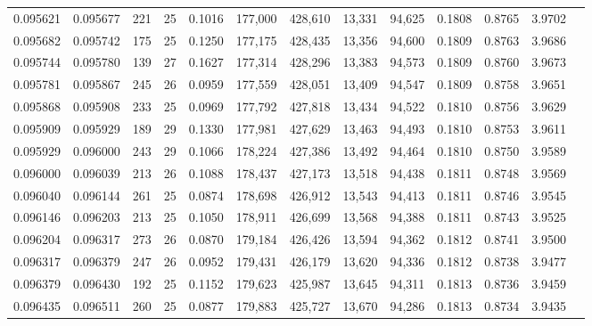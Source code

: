 \begin{tabular}{rrrrrrrrrrrrr}
0.095621 & 0.095677 & 221 &  25 &                                     0.1016 & 177,000 & 428,610 &  13,331 &  94,625 & 0.1808 & 0.8765 & 3.9702 \\
0.095682 & 0.095742 & 175 &  25 &                                     0.1250 & 177,175 & 428,435 &  13,356 &  94,600 & 0.1809 & 0.8763 & 3.9686 \\
0.095744 & 0.095780 & 139 &  27 &                                     0.1627 & 177,314 & 428,296 &  13,383 &  94,573 & 0.1809 & 0.8760 & 3.9673 \\
0.095781 & 0.095867 & 245 &  26 &                                     0.0959 & 177,559 & 428,051 &  13,409 &  94,547 & 0.1809 & 0.8758 & 3.9651 \\
0.095868 & 0.095908 & 233 &  25 &                                     0.0969 & 177,792 & 427,818 &  13,434 &  94,522 & 0.1810 & 0.8756 & 3.9629 \\
0.095909 & 0.095929 & 189 &  29 &                                     0.1330 & 177,981 & 427,629 &  13,463 &  94,493 & 0.1810 & 0.8753 & 3.9611 \\
0.095929 & 0.096000 & 243 &  29 &                                     0.1066 & 178,224 & 427,386 &  13,492 &  94,464 & 0.1810 & 0.8750 & 3.9589 \\
0.096000 & 0.096039 & 213 &  26 &                                     0.1088 & 178,437 & 427,173 &  13,518 &  94,438 & 0.1811 & 0.8748 & 3.9569 \\
0.096040 & 0.096144 & 261 &  25 &                                     0.0874 & 178,698 & 426,912 &  13,543 &  94,413 & 0.1811 & 0.8746 & 3.9545 \\
0.096146 & 0.096203 & 213 &  25 &                                     0.1050 & 178,911 & 426,699 &  13,568 &  94,388 & 0.1811 & 0.8743 & 3.9525 \\
0.096204 & 0.096317 & 273 &  26 &                                     0.0870 & 179,184 & 426,426 &  13,594 &  94,362 & 0.1812 & 0.8741 & 3.9500 \\
0.096317 & 0.096379 & 247 &  26 &                                     0.0952 & 179,431 & 426,179 &  13,620 &  94,336 & 0.1812 & 0.8738 & 3.9477 \\
0.096379 & 0.096430 & 192 &  25 &                                     0.1152 & 179,623 & 425,987 &  13,645 &  94,311 & 0.1813 & 0.8736 & 3.9459 \\
0.096435 & 0.096511 & 260 &  25 &                                     0.0877 & 179,883 & 425,727 &  13,670 &  94,286 & 0.1813 & 0.8734 & 3.9435 \\

\end{tabular}
